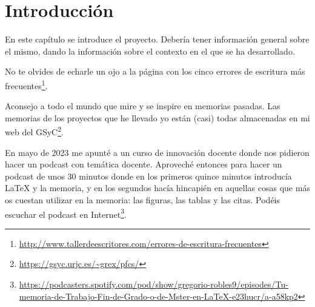 \documentclass[a4paper, 12pt]{book}
\begin{document}


\tableofcontents 
\cleardoublepage
\listoffigures %



\cleardoublepage
\chapter{Introducción}
\label{sec:intro} %

En este capítulo se introduce el proyecto.
Debería tener información general sobre el mismo, dando la información sobre el contexto en el que se ha desarrollado.

No te olvides de echarle un ojo a la página con los cinco errores de escritura más frecuentes\footnote{\url{http://www.tallerdeescritores.com/errores-de-escritura-frecuentes}}.

Aconsejo a todo el mundo que mire y se inspire en memorias pasadas.
Las memorias de los proyectos que he llevado yo están (casi) todas almacenadas en mi web del GSyC\footnote{\url{https://gsyc.urjc.es/~grex/pfcs/}}.

En mayo de 2023 me apunté a un curso de innovación docente donde nos pidieron hacer un podcast con temática docente. Aproveché entonces para hacer un podcast de unos 30 minutos donde en los primeros quince minutos introducía LaTeX y la memoria, y en los segundos hacía hincapién en aquellas cosas que más os cuestan utilizar en la memoria: las figuras, las tablas y las citas. Podéis escuchar el podcast en Internet\footnote{\url{https://podcasters.spotify.com/pod/show/gregorio-robles9/episodes/Tu-memoria-de-Trabajo-Fin-de-Grado-o-de-Mster-en-LaTeX-e23hucr/a-a58kp2}}.
\end{document}
